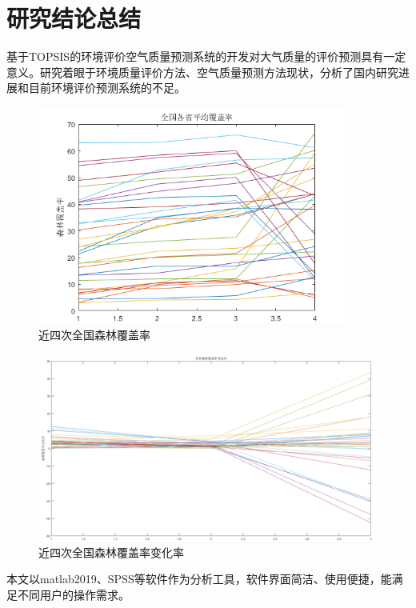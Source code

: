 \documentclass[UTF8]{ctexart}
\begin{document}
\newpage
\section{研究结论总结}
基于TOPSIS的环境评价空气质量预测系统的开发对大气质量的评价预测具有一定意义。研究着眼于环境质量评价方法、空气质量预测方法现状，分析了国内研究进展和目前环境评价预测系统的不足。

\begin{figure}[H] %
    \centering %
    \includegraphics[width=0.9\textwidth]{./picture/geshenglsf.png} %
    \caption{近四次全国森林覆盖率} 
\end{figure}

\begin{figure}[H] %
    \centering %
    \includegraphics[width=1\textwidth]{./picture/newrate.png} %
    \caption{近四次全国森林覆盖率变化率} 
\end{figure}
本文以matlab2019、SPSS等软件作为分析工具，软件界面简洁、使用便捷，能满足不同用户的操作需求。
\end{document}
